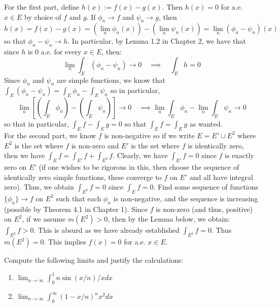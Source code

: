 \documentclass[12pt]{article}
\newenvironment{solution}[2][Solution]{\begin{trivlist}
\item[\hskip \labelsep {\bfseries #1}]}{\end{trivlist}}
\newenvironment{problem}[2][Problem]{\begin{trivlist}
\item[\hskip \labelsep {\bfseries #1}\hskip \labelsep {\bfseries #2.}]}{\end{trivlist}}
\begin{document}
\begin{solution}
    FFor the first part, define $h(x) := f(x) - g(x)$. Then $h(x) = 0$ for a.e. $x\in E$ by choice of $f$ and $g$.
    If $\phi_n \to f$ and $\psi_n \to g$, then 
    \[ h(x) = f(x) - g(x) = (\lim_n \phi_n(x)) - (\lim_n \psi_n(x)) = \lim_n (\phi_n - \psi_n)(x) \]
    so that $\phi_n - \psi_n \to h$. In particular, by Lemma 1.2 in Chapter 2, we have that since $h$ is 0 a.e. for every $x\in E$,
    then:
    \[ \lim_n \int_E (\phi_n - \psi_n) \to 0 \quad \implies \quad \int_E h = 0 \]
    Since $\phi_n$ and $\psi_n$ are simple functions, we know that $\int_E (\phi_n - \psi_n) = \int_E \phi_n - \int_E \psi_n$ so
    in particular,
    \[ \lim_n [(\int_E \phi_n) - (\int_E \psi_n)] \to 0 \quad \implies \lim_n \int_E \phi_n - \lim_n \int_E \psi_n \to 0\]
    so that in particular, $\int_E f - \int_E g = 0$ so that $\int_E f = \int_E g$ as wanted.\\

    For the second part, we know $f$ is non-negative so if we write $E = E' \cup E^2$ where $E^2$ is the set where
    $f$ is non-zero and $E'$ is the set where $f$ is identically zero, then we have $\int_E f = \int_{E'} f + \int_{E^2} f$. 
    Clearly, we have $\int_{E'} f = 0$ since $f$ is exactly zero on $E'$ (if one wishes to be rigorous in this, 
    then choose the sequence of identically zero simple functions, these converge to $f$ on $E'$ and all have integral zero). 
    Thus, we obtain $\int_{E^2} f = 0$ since $\int_E f = 0$. Find some sequence of functions $\{\phi_n\} \to f$ on $E^2$ such that
    each $\phi_n$ is non-negative, and the sequence is increasing (possible by Theorem 4.1 in Chapter 1). Since $f$ is non-zero
    (and thus, positive) on $E^2$, if we assume $m(E^2)>0$, then by the Lemma below, we obtain: $\int_{E^2} f > 0$. This is absurd
    as we have already established $\int_{E^2} f = 0$. Thus $m(E^2) = 0$. This implies $f(x) = 0$ for a.e. $x\in E$.
\end{solution}
\pagebreak

\begin{problem}{5}
    Compute the following limits and justify the calculations:
    \begin{enumerate}
        \item $\lim_{n\to\infty} \int_0^1 n\sin(x/n)/x dx$
        \item $\lim_{n\to\infty} \int_0^{\infty} (1-x/n)^nx^2 dx$
    \end{enumerate}
\end{problem}
\end{document}
